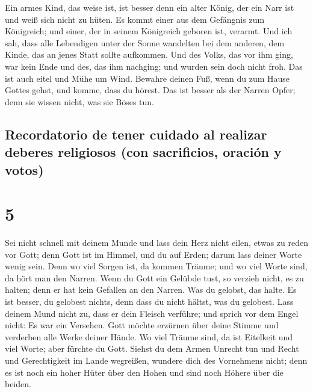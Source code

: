  Ein armes Kind, das weise ist, ist besser denn ein alter
König, der ein Narr ist und weiß sich nicht zu hüten.  Es
kommt einer aus dem Gefängnis zum Königreich; und einer, der in seinem
Königreich geboren ist, verarmt.  Und ich sah, dass alle
Lebendigen unter der Sonne wandelten bei dem anderen, dem Kinde, das an
jenes Statt sollte aufkommen.  Und des Volks, das vor ihm
ging, war kein Ende und des, das ihm nachging; und wurden sein doch
nicht froh. Das ist auch eitel und Mühe um Wind.  Bewahre
deinen Fuß, wenn du zum Hause Gottes gehst, und komme, dass du hörest.
Das ist besser als der Narren Opfer; denn sie wissen nicht, was sie
Böses tun.

\hypertarget{recordatorio-de-tener-cuidado-al-realizar-deberes-religiosos-con-sacrificios-oraciuxf3n-y-votos}{%
\subsection{Recordatorio de tener cuidado al realizar deberes religiosos
(con sacrificios, oración y
votos)}\label{recordatorio-de-tener-cuidado-al-realizar-deberes-religiosos-con-sacrificios-oraciuxf3n-y-votos}}

\hypertarget{section-4}{%
\section{5}\label{section-4}}

 Sei nicht schnell mit deinem Munde und lass dein Herz
nicht eilen, etwas zu reden vor Gott; denn Gott ist im Himmel, und du
auf Erden; darum lass deiner Worte wenig sein.  Denn wo
viel Sorgen ist, da kommen Träume; und wo viel Worte sind, da hört man
den Narren.  Wenn du Gott ein Gelübde tust, so verzieh
nicht, es zu halten; denn er hat kein Gefallen an den Narren. Was du
gelobst, das halte.  Es ist besser, du gelobest nichts,
denn dass du nicht hältst, was du gelobest.  Lass deinem
Mund nicht zu, dass er dein Fleisch verführe; und sprich vor dem Engel
nicht: Es war ein Versehen. Gott möchte erzürnen über deine Stimme und
verderben alle Werke deiner Hände.  Wo viel Träume sind,
da ist Eitelkeit und viel Worte; aber fürchte du Gott. 
Siehst du dem Armen Unrecht tun und Recht und Gerechtigkeit im Lande
wegreißen, wundere dich des Vornehmens nicht; denn es ist noch ein hoher
Hüter über den Hohen und sind noch Höhere über die beiden.

